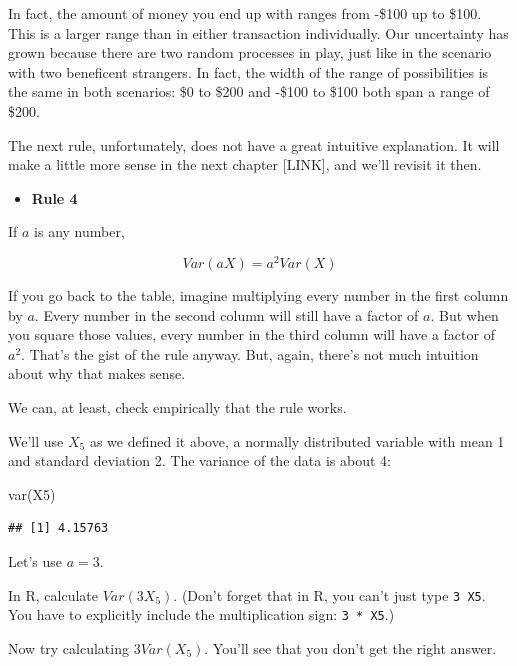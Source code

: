 \documentclass[
]{book}
\newenvironment{Shaded}{\begin{snugshade}}{\end{snugshade}}
\newcommand{\FunctionTok}[1]{\textcolor[rgb]{0.00,0.00,0.00}{#1}}
\newcommand{\NormalTok}[1]{#1}
\providecommand{\tightlist}{%
  \setlength{\itemsep}{0pt}\setlength{\parskip}{0pt}}
\begin{document}
In fact, the amount of money you end up with ranges from -\$100 up to \$100. This is a larger range than in either transaction individually. Our uncertainty has grown because there are two random processes in play, just like in the scenario with two beneficent strangers. In fact, the width of the range of possibilities is the same in both scenarios: \$0 to \$200 and -\$100 to \$100 both span a range of \$200.

The next rule, unfortunately, does not have a great intuitive explanation. It will make a little more sense in the next chapter {[}LINK{]}, and we'll revisit it then.

\begin{itemize}
\tightlist
\item
  \textbf{Rule 4}
\end{itemize}

If \(a\) is any number,

\[
Var\left(aX\right) = a^2 Var\left(X\right)
\]

If you go back to the table, imagine multiplying every number in the first column by \(a\). Every number in the second column will still have a factor of \(a\). But when you square those values, every number in the third column will have a factor of \(a^{2}\). That's the gist of the rule anyway. But, again, there's not much intuition about why that makes sense.

We can, at least, check empirically that the rule works.

We'll use \(X_{5}\) as we defined it above, a normally distributed variable with mean 1 and standard deviation 2. The variance of the data is about 4:

\begin{Shaded}
\begin{Highlighting}[]
\FunctionTok{var}\NormalTok{(X5)}
\end{Highlighting}
\end{Shaded}

\begin{verbatim}
## [1] 4.15763
\end{verbatim}

Let's use \(a = 3\).

In R, calculate \(Var\left(3X_{5}\right)\). (Don't forget that in R, you can't just type \texttt{3\ X5}. You have to explicitly include the multiplication sign: \texttt{3\ *\ X5}.)

Now try calculating \(3 Var\left(X_{5}\right)\). You'll see that you don't get the right answer.
\end{document}
